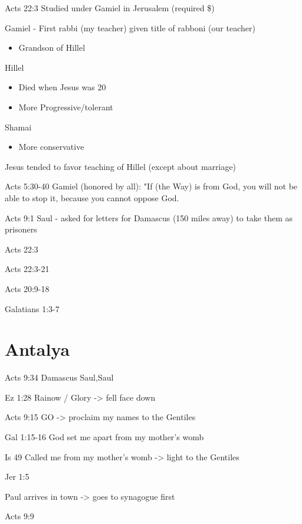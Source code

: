 \documentclass[
]{book}
\providecommand{\tightlist}{%
  \setlength{\itemsep}{0pt}\setlength{\parskip}{0pt}}
\begin{document}
Acts 22:3 Studied under Gamiel in Jerusalem (required \$)

Gamiel - First rabbi (my teacher) given title of rabboni (our teacher)

\begin{itemize}
\tightlist
\item
  Grandson of Hillel
\end{itemize}

Hillel

\begin{itemize}
\tightlist
\item
  Died when Jesus was 20
\item
  More Progressive/tolerant
\end{itemize}

Shamai

\begin{itemize}
\tightlist
\item
  More conservative
\end{itemize}

Jesus tended to favor teaching of Hillel (except about marriage)

Acts 5:30-40 Gamiel (honored by all): "If (the Way) is from God, you will not be able to stop it, because you cannot oppose God.

Acts 9:1 Saul - asked for letters for Damascus (150 miles away) to take them as prisoners

Acts 22:3

Acts 22:3-21

Acts 20:9-18

Galatians 1:3-7

\hypertarget{antalya-1}{%
\chapter{Antalya}\label{antalya-1}}

Acts 9:34 Damascus Saul,Saul

Ez 1:28 Rainow / Glory -\textgreater{} fell face down

Acts 9:15 GO -\textgreater{} proclaim my names to the Gentiles

Gal 1:15-16 God set me apart from my mother's womb

Is 49 Called me from my mother's womb -\textgreater{} light to the Gentiles

Jer 1:5

Paul arrives in town -\textgreater{} goes to synagogue first

Acts 9:9
\end{document}
